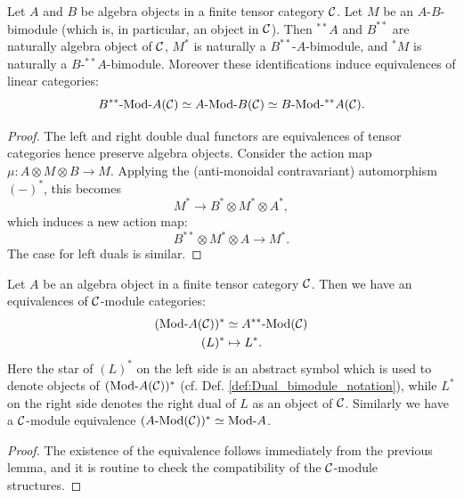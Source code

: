\documentclass{amsart}
\begin{document}
\begin{lemma} \label{lem:dualing-amod}
	Let $A$ and $B$ be algebra objects in a finite tensor category $\mathcal C$. Let $M$ be an $A$-$B$-bimodule (which is, in particular, an object in $\mathcal C$). Then ${}^{**}A$ and $B^{**}$ are naturally algebra object of $\mathcal C$, $M^*$ is naturally a $B^{**}$-$A$-bimodule, and ${}^*M$ is naturally a $B$-${}^{**}A$-bimodule. Moreover these identifications induce equivalences of linear categories:
	\begin{equation*}
		\Mod{B^{**}}{A}(\cC) \simeq \Mod{A}{B}(\cC) \simeq \Mod{B}{{}^{**}A}(\cC).
	\end{equation*}
\end{lemma}

\begin{proof}
	The left and right double dual functors are equivalences of tensor categories hence preserve algebra objects. Consider the action map $\mu:A \otimes M \otimes B \to M$. Applying the (anti-monoidal contravariant) automorphism $(-)^*$, this becomes
	\begin{equation*}
		M^* \to B^* \otimes M^* \otimes A^*,
	\end{equation*}
	which induces a new action map:
	\begin{equation*}
		B^{**} \otimes M^* \otimes A \to M^*.
	\end{equation*}
	The case for left duals is similar. 
\end{proof}

\begin{lemma}
	Let $A$ be an algebra object in a finite tensor category $\mathcal C$. Then we have an equivalences of $\mathcal C$-module categories: 
	\begin{align*}
		(\Mod{}{A}(\cC))^* & \simeq \Mod{A^{**}}{}(\cC) \\
		(L)^* & \mapsto L^*.
	\end{align*}
	Here the star of $(L)^*$ on the left side is an abstract symbol which is used to denote objects of $(\Mod{}{A}(\cC))^*$ (cf. Def. \ref{def:Dual_bimodule_notation}), while $L^*$ on the right side denotes the right dual of $L$ as an object of $\mathcal C$. Similarly we have a $\mathcal C$-module equivalence $(\Mod{A}{}(\cC))^* \simeq \Mod{}{A}$.	
\end{lemma}

\begin{proof}
	The existence of the equivalence follows immediately from the previous lemma, and it is routine to check the compatibility of the $\mathcal C$-module structures.  
\end{proof}
\end{document}

